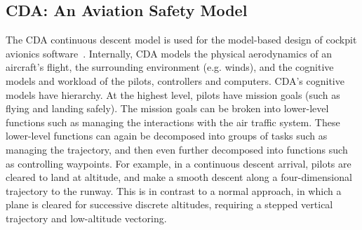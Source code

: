 \documentclass[10pt,journal,compsoc]{IEEEtran}
\begin{document}


\subsection{CDA: An Aviation Safety Model}\label{sec:cda}

The CDA continuous descent model is used for the model-based design of cockpit avionics software~\cite{Kim2011,Pritchett2011,Feigh2012,Kim2013,Pritchett2013}.
Internally, CDA models the physical aerodynamics of an aircraft's flight, the surrounding environment (e.g. winds), and the cognitive models and workload of the pilots, controllers and computers.
CDA's cognitive models have hierarchy.
At the highest level, pilots have mission goals (such as flying and landing safely).
The mission goals can be broken into lower-level functions such as managing the interactions with the air traffic system.
These lower-level functions can again be decomposed into groups of tasks such as managing the trajectory, and then even further decomposed into functions such as controlling waypoints.
For example, in a continuous descent arrival, pilots are cleared to land at altitude, and make a smooth descent along a four-dimensional trajectory to the runway.  
This is in contrast to a normal approach, in which a plane is cleared for successive discrete altitudes, requiring a stepped vertical trajectory and low-altitude vectoring.  
\end{document}
